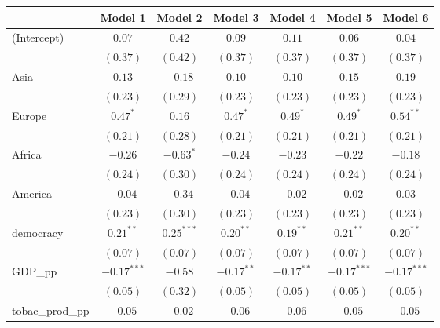 
\begin{table}[!h]
\begin{center}
\begin{tabular}{l c c c c c c }
\toprule
 & Model 1 & Model 2 & Model 3 & Model 4 & Model 5 & Model 6 \\
\midrule
(Intercept)             & $0.07$        & $0.42$       & $0.09$       & $0.11$       & $0.06$        & $0.04$        \\
                        & $(0.37)$      & $(0.42)$     & $(0.37)$     & $(0.37)$     & $(0.37)$      & $(0.37)$      \\
Asia                    & $0.13$        & $-0.18$      & $0.10$       & $0.10$       & $0.15$        & $0.19$        \\
                        & $(0.23)$      & $(0.29)$     & $(0.23)$     & $(0.23)$     & $(0.23)$      & $(0.23)$      \\
Europe                  & $0.47^{*}$    & $0.16$       & $0.47^{*}$   & $0.49^{*}$   & $0.49^{*}$    & $0.54^{**}$   \\
                        & $(0.21)$      & $(0.28)$     & $(0.21)$     & $(0.21)$     & $(0.21)$      & $(0.21)$      \\
Africa                  & $-0.26$       & $-0.63^{*}$  & $-0.24$      & $-0.23$      & $-0.22$       & $-0.18$       \\
                        & $(0.24)$      & $(0.30)$     & $(0.24)$     & $(0.24)$     & $(0.24)$      & $(0.24)$      \\
America                 & $-0.04$       & $-0.34$      & $-0.04$      & $-0.02$      & $-0.02$       & $0.03$        \\
                        & $(0.23)$      & $(0.30)$     & $(0.23)$     & $(0.23)$     & $(0.23)$      & $(0.23)$      \\
democracy               & $0.21^{**}$   & $0.25^{***}$ & $0.20^{**}$  & $0.19^{**}$  & $0.21^{**}$   & $0.20^{**}$   \\
                        & $(0.07)$      & $(0.07)$     & $(0.07)$     & $(0.07)$     & $(0.07)$      & $(0.07)$      \\
GDP\_pp                 & $-0.17^{***}$ & $-0.58$      & $-0.17^{**}$ & $-0.17^{**}$ & $-0.17^{***}$ & $-0.17^{***}$ \\
                        & $(0.05)$      & $(0.32)$     & $(0.05)$     & $(0.05)$     & $(0.05)$      & $(0.05)$      \\
tobac\_prod\_pp         & $-0.05$       & $-0.02$      & $-0.06$      & $-0.06$      & $-0.05$       & $-0.05$       \\

\end{tabular}
\end{center}
\end{table}
